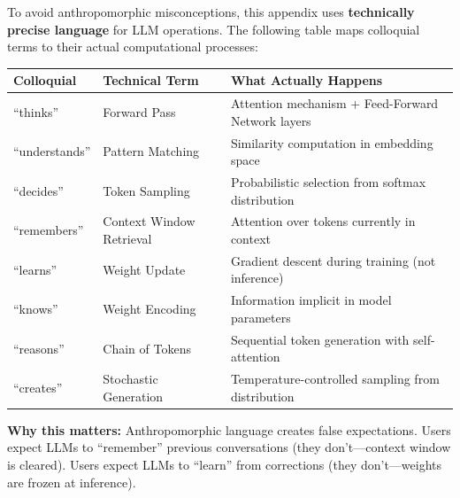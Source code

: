 
\begin{tcolorbox}[colback=yellow!10!white, colframe=yellow!75!black,
    title=\textbf{Technically Precise Terminology: LLMs Do Not ``Think''}]

To avoid anthropomorphic misconceptions, this appendix uses \textbf{technically precise language} for LLM operations. The following table maps colloquial terms to their actual computational processes:

\begin{table}[H]
\centering
\renewcommand{\arraystretch}{1.4}
\begin{tabular}{@{}p{2.5cm}p{4cm}p{5.5cm}@{}}
\toprule
\textbf{Colloquial} & \textbf{Technical Term} & \textbf{What Actually Happens} \\
\midrule
``thinks'' & Forward Pass & Attention mechanism + Feed-Forward Network layers \\
``understands'' & Pattern Matching & Similarity computation in embedding space \\
``decides'' & Token Sampling & Probabilistic selection from softmax distribution \\
``remembers'' & Context Window Retrieval & Attention over tokens currently in context \\
``learns'' & Weight Update & Gradient descent during training (not inference) \\
``knows'' & Weight Encoding & Information implicit in model parameters \\
``reasons'' & Chain of Tokens & Sequential token generation with self-attention \\
``creates'' & Stochastic Generation & Temperature-controlled sampling from distribution \\
\bottomrule
\end{tabular}
\end{table}

\textbf{Why this matters:} Anthropomorphic language creates false expectations. Users expect LLMs to ``remember'' previous conversations (they don't---context window is cleared). Users expect LLMs to ``learn'' from corrections (they don't---weights are frozen at inference).

\end{tcolorbox}



